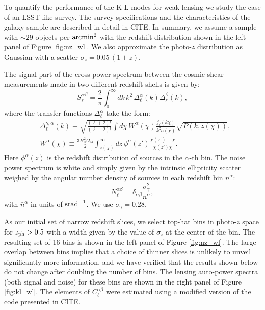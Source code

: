 \documentclass[twocolumn,amsfont,amssymb,amsmath, showpacs,balancelastpage, nofootinbib]{revtex4-1}
\begin{document}
    To quantify the performance of the K-L modes for weak lensing we study the case of an LSST-like survey. The survey specifications and the characteristics of the galaxy sample are described in detail in CITE. In summary, we assume a sample with $\sim29$ objects per ${\rm arcmin}^2$ with the redshift distribution shown in the left panel of Figure \ref{fig:nz_wl}. We also approximate the photo-$z$ distribution as Gaussian with a scatter $\sigma_z=0.05\,(1+z)$.    
    
    The signal part of the cross-power spectrum between the cosmic shear measurements made in two different redshift shells is given by:
    \begin{equation}\label{eq:cl_generic}
      S^{\alpha\beta}_\ell=\frac{2}{\pi}\int_0^\infty dk\,k^2\,\Delta^\alpha_\ell(k)\Delta^\beta_\ell(k),
    \end{equation}
    where the transfer functions $\Delta^{\alpha}_\ell$ take the form:
    \begin{align}\nonumber
      &\Delta^{\gamma,\alpha}_\ell(k)\equiv\sqrt{\frac{(\ell+2)!}{(\ell-2)!}}\int d\chi\,W^\alpha(\chi)\frac{j_\ell(k\chi)}{k^2a(\chi)}\sqrt{P(k,z(\chi))},\\%
      &W^\alpha(\chi)\equiv\frac{3H_0^2\Omega_M}{2}\int_{z(\chi)}^\infty dz\,\phi^\alpha(z')\frac{\chi(z')-\chi}{\chi(z')\chi}.
    \end{align}
    Here $\phi^\alpha(z)$ is the redshift distribution of sources in the $\alpha$-th bin. The noise power spectrum is white and simply given by the intrinsic ellipticity scatter weighed by the angular number density of sources in each redshift bin $\bar{n}^\alpha$:
    \begin{equation}
      N^{\alpha\beta}_\ell=\delta_{\alpha\beta}\frac{\sigma_\gamma^2}{\bar{n}^\alpha},
    \end{equation}
    with $\bar{n}^\alpha$ in units of ${\rm srad}^{-1}$. We use $\sigma_\gamma=0.28$.
    
    As our initial set of narrow redshift slices, we select top-hat bins in photo-$z$ space for $z_{\rm ph}>0.5$ with a width given by the value of $\sigma_z$ at the center of the bin. The resulting set of 16 bins is shown in the left panel of Figure \ref{fig:nz_wl}. The large overlap between bins implies that a choice of thinner slices is unlikely to unveil significantly more information, and we have verified that the results shown below do not change after doubling the number of bins. The lensing auto-power spectra (both signal and noise) for these bins are shown in the right panel of Figure \ref{fig:kl_wl}. The elements of $C^{\alpha\beta}_\ell$ were estimated using a modified version of the code presented in CITE.
    
\end{document}
